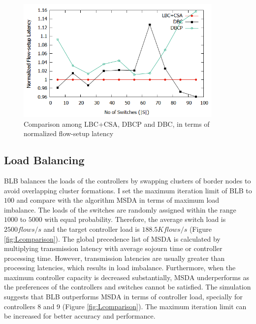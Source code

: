 \documentclass[preprint,12pt]{elsarticle}
\begin{document}
	\begin{figure}
		\centering
		\includegraphics[width=0.9\textwidth]{Images/forced_comparison.png}
		\caption{Comparison among LBC+CSA, DBCP and DBC, in terms of normalized flow-setup latency} \label{fig:Fcomparison}
	\end{figure}
	
	\subsection{Load Balancing} \label{LoadAnalysis}
	BLB balances the loads of the controllers by swapping clusters of border nodes to avoid overlapping cluster formations. I set the maximum iteration limit of BLB to $100$ and compare with the algorithm MSDA \cite{filali2018sdn, fragiadakis2016strategyproof} in terms of maximum load imbalance. The loads of the switches are randomly assigned within the range $1000$ to $5000$ with equal probability. Therefore, the average switch load is $2500 flows/s$ and the target controller load is $188.5K flows/s$ (Figure \ref{fig:Lcomparison}). The global precedence list of MSDA is calculated by multiplying transmission latency with average sojourn time or controller processing time. However, transmission latencies are usually greater than processing latencies, which results in load imbalance. Furthermore, when the maximum controller capacity is decreased substantially, MSDA underperforms as the preferences of the controllers and switches cannot be satisfied. The simulation suggests that BLB outperforms MSDA in terms of controller load, specially for controllers 8 and 9 (Figure \ref{fig:Lcomparison}). The maximum iteration limit can be increased for better accuracy and performance.
	
\end{document}
